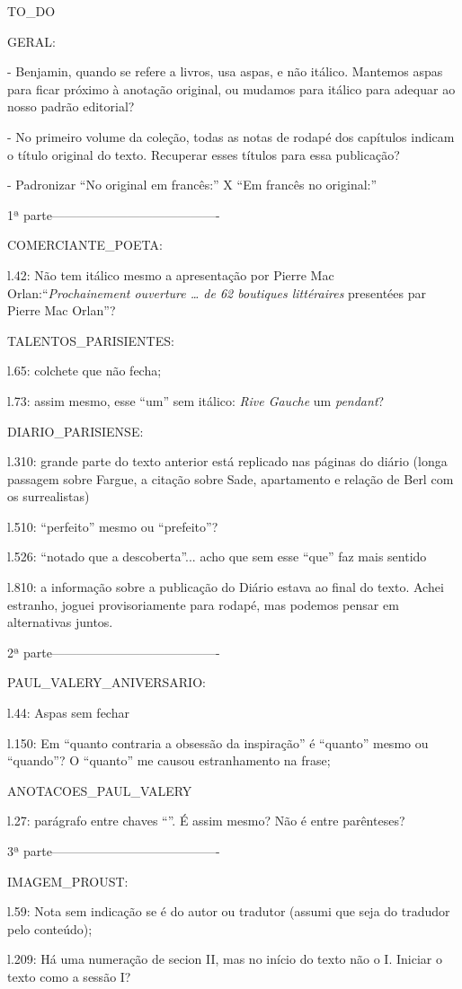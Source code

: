 TO_DO

GERAL:

- Benjamin, quando se refere a livros, usa aspas, e não itálico. Mantemos aspas para ficar próximo à anotação original, ou mudamos para itálico para adequar ao nosso padrão editorial?

- No primeiro volume da coleção, todas as notas de rodapé dos capítulos indicam o título original do texto. Recuperar esses títulos para essa publicação?

- Padronizar ``No original em francês:'' X ``Em francês no original:''

1ª parte----------------------------------------

COMERCIANTE_POETA:

l.42: Não tem itálico mesmo a apresentação por Pierre Mac Orlan:``\emph{Prochainement ouverture \ldots{} de 62 boutiques littéraires} presentées par Pierre Mac Orlan''?

TALENTOS_PARISIENTES:

l.65: colchete que não fecha;

l.73: assim mesmo, esse ``um'' sem itálico: \emph{Rive Gauche} um \emph{pendant}?

DIARIO_PARISIENSE:

l.310: grande parte do texto anterior está replicado nas páginas do diário (longa passagem sobre Fargue, a citação sobre Sade, apartamento e relação de Berl com os surrealistas)

l.510: ``perfeito'' mesmo ou ``prefeito''?

l.526: ``notado que a descoberta''... acho que sem esse ``que'' faz mais sentido

l.810: a informação sobre a publicação do Diário estava ao final do texto. Achei estranho, joguei provisoriamente para rodapé, mas podemos pensar em alternativas juntos.


2ª parte----------------------------------------

PAUL_VALERY_ANIVERSARIO:

l.44: Aspas sem fechar

l.150: Em ``quanto contraria a obsessão da inspiração'' é ``quanto'' mesmo ou ``quando''? O ``quanto'' me causou estranhamento na frase;

ANOTACOES_PAUL_VALERY

l.27: parágrafo entre chaves ``{}''. É assim mesmo? Não é entre parênteses?

3ª parte----------------------------------------

IMAGEM_PROUST:

l.59: Nota sem indicação se é do autor ou tradutor (assumi que seja do tradudor pelo conteúdo);

l.209: Há uma numeração de secion II, mas no início do texto não o I. Iniciar o texto como a sessão I?